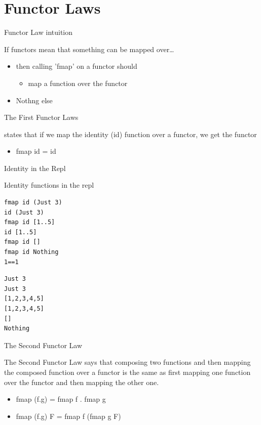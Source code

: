 \documentclass[presetation]{beamer}
\begin{document}
\section{Functor Laws}
\label{sec:orgc2e2920}
\begin{frame}[label={sec:org5c04137}]{Functor Law intuition}
\begin{block}{If functors mean that something can be mapped over\ldots{}}
\begin{itemize}
\item then calling 'fmap' on a functor should
\begin{itemize}
\item map a function over the functor
\end{itemize}
\end{itemize}
\pause
\begin{itemize}
\item \alert{Nothng else}
\end{itemize}
\end{block}
\end{frame}

\begin{frame}[label={sec:org0435ab9}]{The First Functor Laws}
\begin{definition}
states that if we map the identity (id) function over a functor, we
get the functor
\begin{itemize}
\item fmap id = id
\end{itemize}
\end{definition}
\end{frame}

\begin{frame}[fragile,label={sec:org6a786b9}]{Identity in the Repl}
 \begin{block}{Identity functions in the repl}
\begin{verbatim}
fmap id (Just 3)
id (Just 3)
fmap id [1..5]
id [1..5]
fmap id []
fmap id Nothing
1==1
\end{verbatim}

\begin{verbatim}
Just 3
Just 3
[1,2,3,4,5]
[1,2,3,4,5]
[]
Nothing
\end{verbatim}
\end{block}
\end{frame}

\begin{frame}[label={sec:orga440f0d}]{The Second Functor Law}
\begin{definition}
The Second Functor Law says that composing two functions and then
mapping the composed function over a functor is the same as first
mapping one function over the functor and then mapping the other one.
\begin{itemize}
\item fmap (f.g) = fmap f . fmap g
\item fmap (f.g) F = fmap f (fmap g F)
\end{itemize}
\end{definition}
\end{frame}
\end{document}
